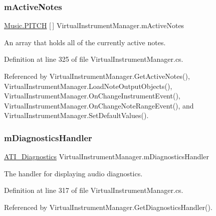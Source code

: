 \subsubsection{\texorpdfstring{m\+Active\+Notes}{mActiveNotes}}
{\footnotesize\ttfamily \hyperlink{group___music_enums_ga508f69b199ea518f935486c990edac1d}{Music.\+P\+I\+T\+CH} \mbox{[}$\,$\mbox{]} Virtual\+Instrument\+Manager.\+m\+Active\+Notes\hspace{0.3cm}{\ttfamily [private]}}



An array that holds all of the currently active notes. 



Definition at line 325 of file Virtual\+Instrument\+Manager.\+cs.



Referenced by Virtual\+Instrument\+Manager.\+Get\+Active\+Notes(), Virtual\+Instrument\+Manager.\+Load\+Note\+Output\+Objects(), Virtual\+Instrument\+Manager.\+On\+Change\+Instrument\+Event(), Virtual\+Instrument\+Manager.\+On\+Change\+Note\+Range\+Event(), and Virtual\+Instrument\+Manager.\+Set\+Default\+Values().

\mbox{\label{group___v_i_m_priv_gafabe4a874fc21f7bcedf431df3b94201}} 
\subsubsection{\texorpdfstring{m\+Diagnostics\+Handler}{mDiagnosticsHandler}}
{\footnotesize\ttfamily \hyperlink{group___audio_testing_class_a_t_i___diagnostics}{A\+T\+I\+\_\+\+Diagnostics} Virtual\+Instrument\+Manager.\+m\+Diagnostics\+Handler\hspace{0.3cm}{\ttfamily [private]}}



The handler for displaying audio diagnostics. 



Definition at line 317 of file Virtual\+Instrument\+Manager.\+cs.



Referenced by Virtual\+Instrument\+Manager.\+Get\+Diagnostics\+Handler().

\mbox{\label{group___v_i_m_priv_ga0bc7c9f776b0d2dae0ccb1f1ee5f2143}} 
